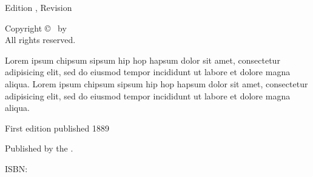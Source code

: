
\clearpage

\begin{adjustwidth}{0.23\textwidth}{0.23\textwidth}
\begingroup
  \null\vfill
  \begin{center}
  \utitle\par
  Edition \uedition, Revision \urevision\par
  Copyright \copyright{} \udate\ by \uauthor\\
  All rights reserved.\par

  Lorem ipsum chipsum sipsum hip hop hapsum dolor sit amet, consectetur adipisicing elit, sed do eiusmod tempor incididunt ut labore et dolore magna aliqua. Lorem ipsum chipsum sipsum hip hop hapsum dolor sit amet, consectetur adipisicing elit, sed do eiusmod tempor incididunt ut labore et dolore magna aliqua.\par
  
  First edition published 1889\par
  Published by the \upublisher.\par
  ISBN: \uisbn\par

  \uwebsite
  \end{center}
  \vspace*{10mm}
\endgroup
\end{adjustwidth}

\clearpage